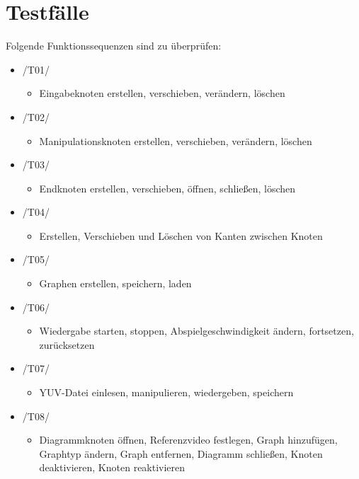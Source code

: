 \section{Testfälle}

Folgende Funktionssequenzen sind zu überprüfen:
\begin{itemize}
	\item /T01/
		\begin{itemize}
			\item Eingabeknoten erstellen, verschieben, verändern, löschen
		\end{itemize}
	\item /T02/
		\begin{itemize}
			\item Manipulationsknoten erstellen, verschieben, verändern, löschen
		\end{itemize}
	\item /T03/
		\begin{itemize}
			\item Endknoten erstellen, verschieben, öffnen, schließen, löschen
		\end{itemize}
	\item /T04/
		\begin{itemize}
			\item Erstellen, Verschieben und Löschen von Kanten zwischen Knoten
		\end{itemize}
	\item /T05/
		\begin{itemize}
			\item Graphen erstellen, speichern, laden
		\end{itemize}
	\item /T06/
		\begin{itemize}
			\item Wiedergabe starten, stoppen, Abspielgeschwindigkeit ändern, fortsetzen, zurücksetzen
		\end{itemize}
	\item /T07/
		\begin{itemize}
			\item YUV-Datei einlesen, manipulieren, wiedergeben, speichern
		\end{itemize}
	\item /T08/
		\begin{itemize}
			\item Diagrammknoten öffnen, Referenzvideo festlegen, Graph hinzufügen, Graphtyp ändern, Graph entfernen, Diagramm schließen, Knoten deaktivieren, Knoten 
			reaktivieren
		\end{itemize}
\end{itemize}

